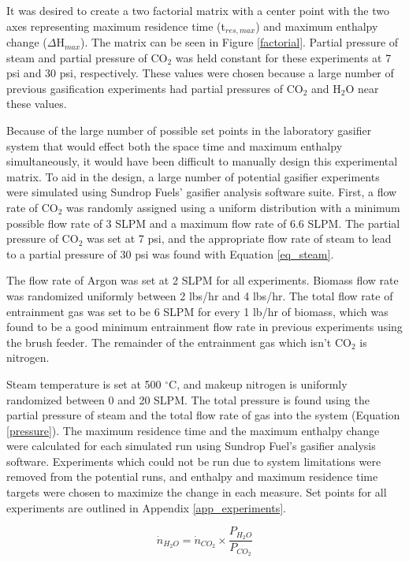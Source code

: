\documentclass[11pt,twocolumn]{article}
\begin{document}
It was desired to create a two factorial matrix with a center point with the two axes representing maximum residence time (t$_{res,max}$) and maximum enthalpy change ($\Delta$H$_{max}$).  The matrix can be seen in Figure \ref{factorial}.  Partial pressure of steam and partial pressure of CO$_2$ was held constant for these experiments at 7 psi and 30 psi, respectively.  These values were chosen because a large number of previous gasification experiments had partial pressures of CO$_2$ and H$_2$O near these values.  

Because of the large number of possible set points in the laboratory gasifier system that would effect both the space time and maximum enthalpy simultaneously, it would have been difficult to manually design this experimental matrix.  To aid in the design, a large number of potential gasifier experiments were simulated using Sundrop Fuels' gasifier analysis software suite.  First, a flow rate of CO$_2$ was randomly assigned using a uniform distribution with a minimum possible flow rate of 3 SLPM and a maximum flow rate of 6.6 SLPM.  The partial pressure of CO$_2$ was set at 7 psi, and the appropriate flow rate of steam to lead to a partial pressure of 30 psi was found with Equation \ref{eq_steam}.

The flow rate of Argon was set at 2 SLPM for all experiments.  Biomass flow rate was randomized uniformly between 2 lbs/hr and 4 lbs/hr.  The total flow rate of entrainment gas was set to be 6 SLPM for every 1 lb/hr of biomass, which was found to be a good minimum entrainment flow rate in previous experiments using the brush feeder.  The remainder of the entrainment gas which isn't CO$_2$ is nitrogen.

Steam temperature is set at 500 $^\circ$C, and makeup nitrogen is uniformly randomized between 0 and 20 SLPM.  The total pressure is found using the partial pressure of steam and the total flow rate of gas into the system (Equation \ref{pressure}).  The maximum residence time and the maximum enthalpy change were calculated for each simulated run using Sundrop Fuel's gasifier analysis software.  Experiments which could not be run due to system limitations were removed from the potential runs, and enthalpy and maximum residence time targets were chosen to maximize the change in each measure.  Set points for all experiments are outlined in Appendix \ref{app_experiments}.

\begin{equation}
	\dot{n}_{H_2O} = \dot{n}_{CO_2} \times \frac{P_{H_2O}}{P_{CO_2}}
	\label{eq_steam}
\end{equation}
\end{document}
